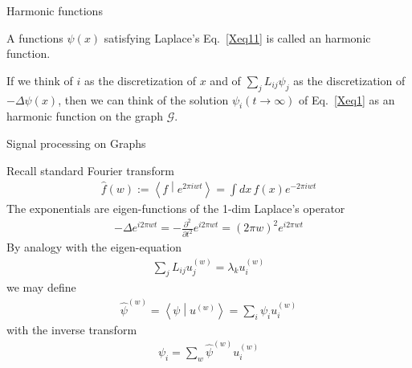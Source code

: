 \documentclass{beamer}
\newcommand{\braket}[2]{\left\langle #1 \middle| #2  \right\rangle}
\begin{document}

\begin{frame}{Harmonic functions}

A functions $\psi(x)$ satisfying Laplace's Eq.~\ref{Xeq11} is called an harmonic function.

\vspace{0.25cm}

If we think of $i$ as the discretization of $x$ and of $\sum_j L_{ij} \psi_j$ as the discretization of $-\Delta \psi(x)$, then we can think of the solution $\psi_i(t\to \infty)$ of Eq.~\ref{Xeq1} as an harmonic function on the graph $\mathcal{G}$.
\end{frame}



\begin{frame}{Signal processing on Graphs}

Recall standard Fourier transform
\begin{eqnarray}
\hat{f}(w)
:=
\braket{f}{e^{2\pi i wt}}
=
\int dx\,
f(x)e^{-2\pi i wt}
\end{eqnarray}
The exponentials are eigen-functions of the 1-dim Laplace's operator
\begin{eqnarray}
-
\Delta 
e^{i 2\pi wt}
=
-
\frac{\partial^2 }{\partial t^2}
e^{i 2\pi wt}
=
(2\pi w)^2
e^{i 2\pi wt}
\end{eqnarray}
By analogy with the eigen-equation
\begin{eqnarray}
\sum_j
L_{ij} u_j^{(w)}
=
\lambda_k
u_i^{(w)}
\end{eqnarray}
we may define
\begin{eqnarray}
\hat{\psi}^{(w)}
=
\braket{\psi}{u^{(w)}}
=
\sum_i
\psi_i
u_i^{(w)}
\end{eqnarray}
with the inverse transform
\begin{eqnarray}
\psi_i
=
\sum_w
\hat{\psi}^{(w)}
u_i^{(w)}
\end{eqnarray}

\end{frame}




\end{document}
